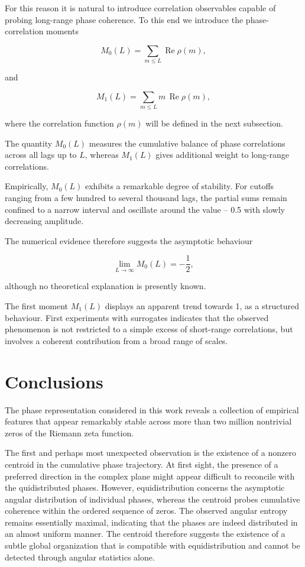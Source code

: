 \documentclass[11pt]{amsart}
\theoremstyle{definition}
\theoremstyle{remark}
\begin{document}
For this reason it is natural to introduce correlation
observables capable of probing long-range phase coherence.
To this end we introduce the phase-correlation moments

\begin{equation}
M_0(L)
=
\sum_{m\le L}
\operatorname{Re}\rho(m),
\label{eq:M0L}
\end{equation}

and

\begin{equation}
M_1(L)
=
\sum_{m\le L}
m\,\operatorname{Re}\rho(m),
\label{eq:M1L}
\end{equation}

where the correlation function \(\rho(m)\) will be
defined in the next subsection.

The quantity \(M_0(L)\) measures the cumulative balance of
phase correlations across all lags up to \(L\), whereas
\(M_1(L)\) gives additional weight to long-range
correlations.

Empirically, \(M_0(L)\) exhibits a remarkable degree of
stability. For cutoffs ranging from a few hundred to
several thousand lags, the partial sums remain confined to
a narrow interval and oscillate around the value -- 0.5 with slowly decreasing amplitude.

The numerical evidence therefore suggests the asymptotic
behaviour

\begin{equation}
\lim_{L\to\infty}
M_0(L)
=
-\frac12,
\label{eq:M0limit}
\end{equation}

although no theoretical explanation is presently known.

The first moment \(M_1(L)\) displays an apparent trend towards 1, as
a structured behaviour. First experiments with surrogates indicates that the observed phenomenon is not
restricted to a simple excess of short-range correlations,
but involves a coherent contribution from a broad range of
scales.


\section{Conclusions}

The phase representation considered in this work reveals a collection of empirical features that appear remarkably stable across more than two million nontrivial zeros of the Riemann zeta function.

The first and perhaps most unexpected observation is the existence of a nonzero centroid in the cumulative phase trajectory. At first sight, the presence of a preferred direction in the complex plane might appear difficult to reconcile with the quidistributed phases. However, equidistribution concerns the asymptotic angular distribution of individual phases, whereas the centroid probes cumulative coherence within the ordered sequence of zeros. The observed angular entropy remains essentially maximal, indicating that the phases are indeed distributed in an almost uniform manner. The centroid therefore suggests the existence of a subtle global organization that is compatible with equidistribution and cannot be detected through angular statistics alone.
\end{document}
